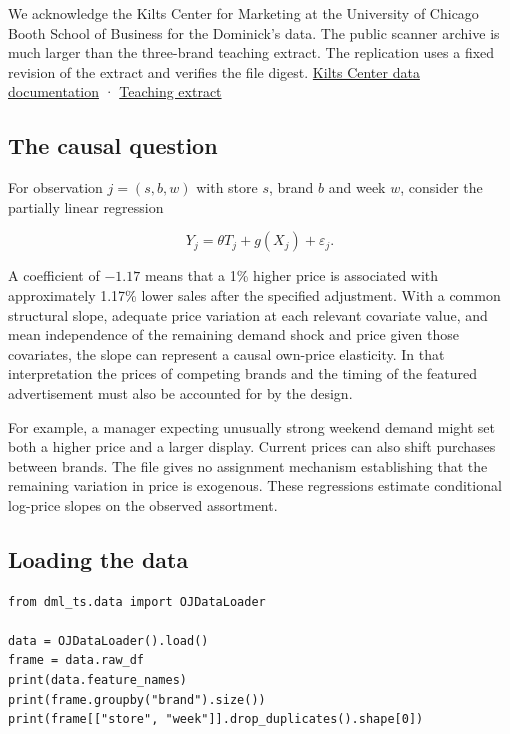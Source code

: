 We acknowledge the Kilts Center for Marketing at the University of Chicago Booth School of Business for the Dominick's data. The public scanner archive is much larger than the three-brand teaching extract. The replication uses a fixed revision of the extract and verifies the file digest. \href{https://www.chicagobooth.edu/research/kilts/research-data/dominicks}{Kilts Center data documentation} · \href{https://github.com/gchoi/Dataset/blob/8e81d46872564218a78be95d53a9c6bd3b00b199/oj.csv}{Teaching extract}

\subsection{The causal question}

For observation \(j=(s,b,w)\) with store \(s\), brand \(b\) and week \(w\), consider the partially linear regression

\[
Y_j = \theta T_j + g(X_j) + \varepsilon_j.
\]

A coefficient of \(-1.17\) means that a 1\% higher price is associated with approximately 1.17\% lower sales after the specified adjustment. With a common structural slope, adequate price variation at each relevant covariate value, and mean independence of the remaining demand shock and price given those covariates, the slope can represent a causal own-price elasticity. In that interpretation the prices of competing brands and the timing of the featured advertisement must also be accounted for by the design.

For example, a manager expecting unusually strong weekend demand might set both a higher price and a larger display. Current prices can also shift purchases between brands. The file gives no assignment mechanism establishing that the remaining variation in price is exogenous. These regressions estimate conditional log-price slopes on the observed assortment.

\subsection{Loading the data}

\begin{verbatim}
from dml_ts.data import OJDataLoader

data = OJDataLoader().load()
frame = data.raw_df
print(data.feature_names)
print(frame.groupby("brand").size())
print(frame[["store", "week"]].drop_duplicates().shape[0])
\end{verbatim}

